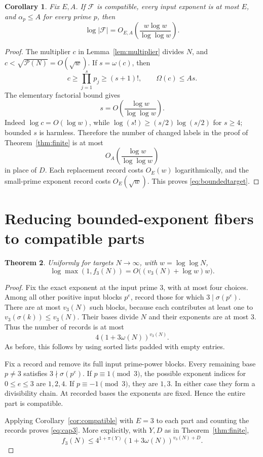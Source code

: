 \documentclass[11pt]{article}
\newtheorem{theorem}{Theorem}[section]
\newtheorem{corollary}[theorem]{Corollary}
\newcommand{\PP}{\mathcal P}
\newcommand{\FF}{\mathcal F}
\begin{document}
\begin{corollary}\label{cor:boundedtarget}
Fix $E,A$. If $\FF$ is compatible, every input exponent is at most $E$, and $\alpha_p\le A$ for every prime $p$, then
\begin{equation}\label{eq:boundedtarget}
 \log|\FF|=O_{E,A}\!\left(\frac{w\log w}{\log\log w}\right).
\end{equation}
\end{corollary}
\begin{proof}
The multiplier $c$ in Lemma~\ref{lem:multiplier} divides $N$, and $c<\sqrt{\PP(N)}=O(\sqrt w)$. If $s=\omega(c)$, then
\[
 c\ge\prod_{j=1}^{s}p_j\ge(s+1)!,\qquad \Omega(c)\le As.
\]
The elementary factorial bound gives
\[
 s=O\!\left(\frac{\log w}{\log\log w}\right).
\]
Indeed $\log c=O(\log w)$, while $\log(s!)\ge(s/2)\log(s/2)$ for $s\ge4$; bounded $s$ is harmless. Therefore the number of changed labels in the proof of Theorem~\ref{thm:finite} is at most
\[
 O_A\!\left(\frac{\log w}{\log\log w}\right)
\]
in place of $D$. Each replacement record costs $O_E(w)$ logarithmically, and the small-prime exponent record costs $O_E(\sqrt w)$. This proves \eqref{eq:boundedtarget}.
\end{proof}

\section{Reducing bounded-exponent fibers to compatible parts}
\begin{theorem}\label{thm:cap3}
Uniformly for targets $N\to\infty$, with $w=\log\log N$,
\begin{equation}\label{eq:cap3}
 \boxed{\log\max(1,f_3(N))
 =O\bigl((v_3(N)+\log w)w\bigr).}
\end{equation}
\end{theorem}
\begin{proof}
Fix the exact exponent at the input prime $3$, with at most four choices. Among all other positive input blocks $p^e$, record those for which $3\mid\sigma(p^e)$. There are at most $v_3(N)$ such blocks, because each contributes at least one to $v_3(\sigma(k))\le v_3(N)$. Their bases divide $N$ and their exponents are at most $3$. Thus the number of records is at most
\[
 4(1+3\omega(N))^{v_3(N)}.
\]
As before, this follows by using sorted lists padded with empty entries.

Fix a record and remove its full input prime-power blocks. Every remaining base $p\ne3$ satisfies $3\nmid\sigma(p^e)$. If $p\equiv1\pmod3$, the possible exponent indices for $0\le e\le3$ are $1,2,4$. If $p\equiv-1\pmod3$, they are $1,3$. In either case they form a divisibility chain. At recorded bases the exponents are fixed. Hence the entire part is compatible.

Applying Corollary~\ref{cor:compatible} with $E=3$ to each part and counting the records proves \eqref{eq:cap3}. More explicitly, with $Y,D$ as in Theorem~\ref{thm:finite},
\[
 f_3(N)\le4^{1+\pi(Y)}(1+3\omega(N))^{v_3(N)+D}.
\]
\end{proof}
\end{document}

